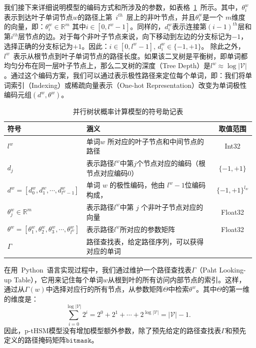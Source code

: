我们接下来详细说明模型的编码方式和所涉及的参数，如表格~\ref{tab:note}~所示。其中，$\theta_i^w $表示到达叶子单词节点$w$的路径上第~$i^{th}$~层上的非叶节点，并且$\theta_i ^ w$是一个 $m$维度的向量，即：$\theta_i^w \in\mathbb{R}^m $ 其中$ i \in [0, l^w-1] $。同样的，$ d_i^w $表示连接第$(i-1)^{th}$层和第$i^{th}$层节点的边。对于每个非叶子节点来说，向下移动到左边的分支标记为$ -1 $，选择正确的分支标记为$ + 1 $。因此：$i\in[0,l^w-1]$, $d_i^w\in \{-1,+1\}$。 除此之外， $l^w$~表示从根节点到叶子单词节点的路径长度。如果该二叉树是平衡树，即单词都均匀分布在同一层叶子节点上，那么二叉树的深度（Tree Depth）是$l^w\approx \log \mathcal{|V|}$ 。通过这个编码方案，我们可以通过表示极性路径来定位每个单词，即：我们将单词索引（Indexing）或稀疏向量表示（One-hot Representation）改变为单词极性编码元组$(d^w,\theta^w)$。

\begin{table}[!ht]
  \centering
  \caption{并行树状概率计算模型的符号助记表\label{tab:note}}
\begin{tabular}{llc}
  \toprule
   符号&涵义&取值范围\\ \midrule
$l^w$ &单词$w$ 所对应的叶子节点和中间节点的路径&Int32 \\
$d_j$&表示路径$l^w$中第$j$个节点对应的编码（根节点对应编码$0$）&$ \{-1,+1\}$\\
$ d^w=[d_0^w,d_1^w,\cdots,d_{l^w-1}^w] $& 单词 $w$ 的极性编码，他由 $l^w-1$位编码构成，&$\{-1,+1\}^{l_w}$\\
$\theta_{j}^w\in\mathbb{R}^m$ &表示路径$l^w$中第 $j$ 个非叶子节点对应的向量& Float32\\
$ \theta^w=[\theta_1^w,\theta_2^w,\theta_3^w, \cdots,\theta_{l^w}^w]$&表示路径$l^w$所对应的参数矩阵&Float32 \\
$\Gamma$ &路径查找表，给定路径序列，可以获得对应的单词& \\
  \bottomrule
\end{tabular}
\end{table}

在用~Python~语言实现过程中，我们通过维护一个路径查找表$\Gamma$（Paht Looking-up Table），它用来记住每个单词$ w $从根到叶的所有访问内部节点的索引。这样，通过从$ \Gamma(w)$中选择对应行的所有节点，从参数矩阵${\Theta} $中检索$ \theta ^ w $。其中${\Theta} $的第一维的维度是：
\begin{equation}\label{equ:sums}
\sum_{i=0}^{\log \mathcal{|V|}}{2^i} =2^0+2^1+\cdots+2^{\log \mathcal{|V|}}= \mathcal{|V|} -1.
\end{equation}
因此，p-tHSM模型没有增加模型额外参数，除了预先给定的路径查找表$\Gamma$和预先定义的路径掩码矩阵$\mathtt{bitmask}$。




